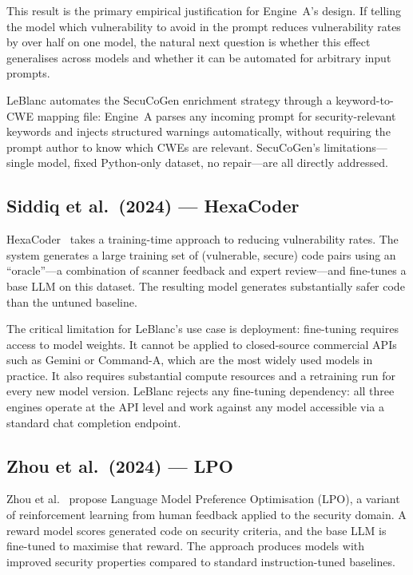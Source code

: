 \documentclass[12pt,a4paper]{report}
\begin{document}
This result is the primary empirical justification for Engine~A's design. If
telling the model which vulnerability to avoid in the prompt reduces vulnerability
rates by over half on one model, the natural next question is whether this effect
generalises across models and whether it can be automated for arbitrary input
prompts.

LeBlanc automates the SecuCoGen enrichment strategy through a keyword-to-CWE
mapping file: Engine~A parses any incoming prompt for security-relevant keywords
and injects structured warnings automatically, without requiring the prompt
author to know which CWEs are relevant. SecuCoGen's limitations---single model,
fixed Python-only dataset, no repair---are all directly addressed.

\subsection{Siddiq et al.\ (2024) --- HexaCoder}
\label{ssec:hexacoder}

HexaCoder~\cite{hexacoder2024} takes a training-time approach to reducing
vulnerability rates. The system generates a large training set of (vulnerable,
secure) code pairs using an ``oracle''---a combination of scanner feedback and
expert review---and fine-tunes a base LLM on this dataset. The resulting model
generates substantially safer code than the untuned baseline.

The critical limitation for LeBlanc's use case is deployment: fine-tuning
requires access to model weights. It cannot be applied to closed-source commercial
APIs such as Gemini or Command-A, which are the most widely used models in
practice. It also requires substantial compute resources and a retraining run
for every new model version. LeBlanc rejects any fine-tuning dependency: all
three engines operate at the API level and work against any model accessible via
a standard chat completion endpoint.

\subsection{Zhou et al.\ (2024) --- LPO}
\label{ssec:lpo}

Zhou et al.~\cite{lpo2024} propose Language Model Preference Optimisation (LPO),
a variant of reinforcement learning from human feedback applied to the security
domain. A reward model scores generated code on security criteria, and the base
LLM is fine-tuned to maximise that reward. The approach produces models with
improved security properties compared to standard instruction-tuned baselines.
\end{document}
